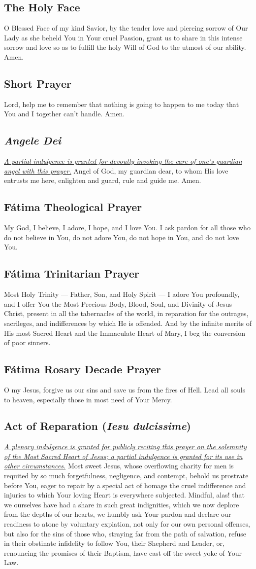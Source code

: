 \documentclass[12pt]{article}
\newcommand{\prayertitle}[1]{\subsection{#1}}
\newcommand{\indulgencedprayertitle}[1]{\prayertitle{#1 \protect\kreuz}}
\newcommand{\emphasis}[1]{\emph{#1}}
\newcommand{\emphasis}[1]{\textsl{#1}}
\newcommand{\foreign}[1]{\emphasis{#1}}
\newcommand{\note}[1]{{\small{\emphasis{#1}}}\newline}
\newcommand{\linkednote}[2]{\hyperlink{#1}{\note{#2}}}
\begin{document}
\prayertitle{The Holy Face}
\label{prayer:holy_face}
O Blessed Face of my kind Savior, by the tender love and piercing sorrow of Our Lady as she beheld You in Your cruel Passion, grant us to share in this intense sorrow and love
so as to fulfill the holy Will of God to the utmost of our ability.
Amen.

\prayertitle{Short Prayer}
\label{prayer:short}
Lord, help me to remember that nothing is going to happen to me today that You and I together can't handle. Amen.

\indulgencedprayertitle{\foreign{Angele Dei}}
\linkednote{grant18}{A partial indulgence is granted for devoutly invoking the care of one's guardian angel with this prayer.}
Angel of God, my guardian dear, to whom His love entrusts me here, enlighten and guard, rule and guide me. Amen.

\prayertitle{F\'{a}tima Theological Prayer}
My God, I believe, I adore, I hope, and I love You. I ask pardon for all those who do not believe in You, do not adore You, do not hope in You, and do not love You.

\prayertitle{F\'{a}tima Trinitarian Prayer}
Most Holy Trinity --- Father, Son, and Holy Spirit --- I adore You profoundly, and I offer You the Most Precious Body, Blood, Soul, and Divinity of Jesus Christ, present in all the tabernacles of the world, in reparation for the outrages, sacrileges, and indifferences by which He is offended.
And by the infinite merits of His most Sacred Heart and the Immaculate Heart of Mary, I beg the conversion of poor sinners.

\prayertitle{F\'{a}tima Rosary Decade Prayer}
O my Jesus, forgive us our sins and save us from the fires of Hell.
Lead all souls to heaven, especially those in most need of Your Mercy.

\indulgencedprayertitle{Act of Reparation (\foreign{Iesu dulcissime})}
\linkednote{grant3}{A plenary indulgence is granted for publicly reciting this prayer on the solemnity of the Most Sacred Heart of Jesus;
a partial indulgence is granted for its use in other circumstances.}
Most sweet Jesus, whose overflowing charity for men is requited by so much forgetfulness, negligence, and contempt, behold us prostrate before You, eager to repair by a special act of homage the cruel indifference and injuries to which Your loving Heart is everywhere subjected.
Mindful, alas! that we ourselves have had a share in such great indignities, which we now deplore from the depths of our hearts, we humbly ask Your pardon and declare our readiness to atone by voluntary expiation, not only for our own personal offenses, but also for the sins of those who, straying far from the path of salvation, refuse in their obstinate infidelity to follow You, their Shepherd and Leader, or, renouncing the promises of their Baptism, have cast off the sweet yoke of Your Law.
\end{document}
